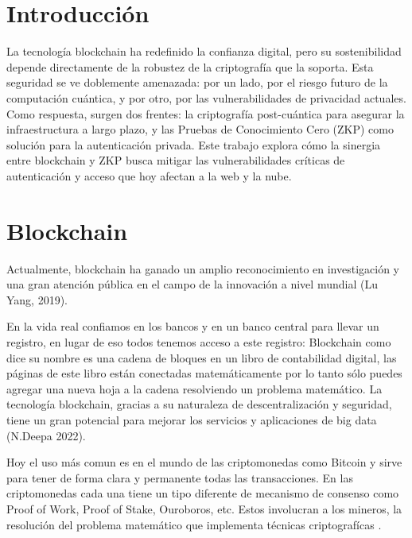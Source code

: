 \documentclass[conference]{IEEEtran}
\begin{document}
\section{Introducción}
La tecnología blockchain ha redefinido la confianza digital, pero su sostenibilidad 
depende directamente de la robustez de la criptografía que la soporta. Esta seguridad 
se ve doblemente amenazada: por un lado, por el riesgo futuro de la computación 
cuántica, y por otro, por las vulnerabilidades de privacidad actuales. Como respuesta, 
surgen dos frentes: la criptografía post-cuántica para asegurar la infraestructura a 
largo plazo, y las Pruebas de Conocimiento Cero (ZKP) como solución para la 
autenticación privada. Este trabajo explora cómo la sinergia entre blockchain y ZKP 
busca mitigar las vulnerabilidades críticas de autenticación y acceso que hoy afectan 
a la web y la nube.

\section{Blockchain}

Actualmente, blockchain ha ganado un amplio reconocimiento en investigación y una
gran atención pública en el campo de la innovación a nivel mundial (Lu Yang, 2019).

En la vida real confiamos en los bancos y en un banco central para llevar un registro, 
en lugar de eso todos tenemos acceso a este registro: Blockchain como dice su nombre es 
una cadena de bloques en un libro de contabilidad digital, las páginas de este libro están 
conectadas matemáticamente por lo tanto sólo puedes agregar una nueva hoja a la cadena 
resolviendo un problema matemático. La tecnología blockchain, gracias a su naturaleza de 
descentralización y seguridad, tiene un gran potencial para mejorar los servicios y aplicaciones de big data (N.Deepa 2022). 

Hoy el uso más comun es en el mundo de las criptomonedas como Bitcoin y sirve para tener de forma clara y permanente 
todas las transacciones. En las criptomonedas cada una tiene un tipo diferente de mecanismo de 
consenso como Proof of Work, Proof of Stake, Ouroboros, etc. Estos involucran a los mineros, 
la resolución del problema matemático que implementa técnicas criptografícas .
\end{document}
